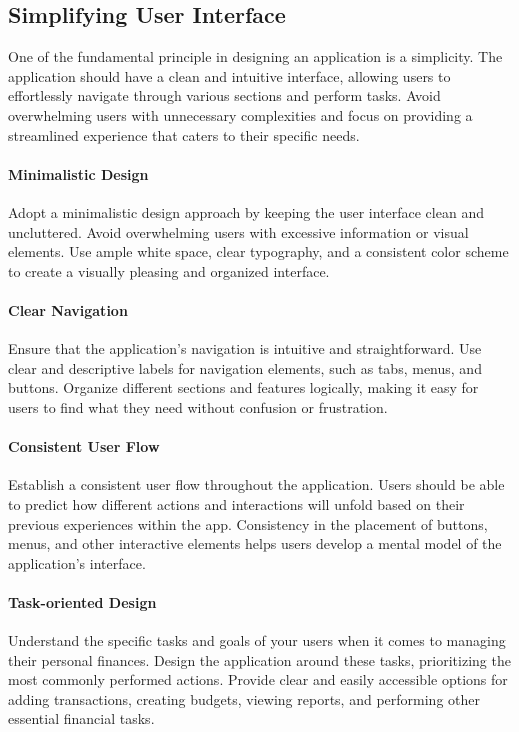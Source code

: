 \subsection{Simplifying User Interface}

One of the fundamental principle in designing an application is a simplicity. The application should have a clean and 
intuitive interface, allowing users to effortlessly navigate through various sections and perform tasks. Avoid 
overwhelming users with unnecessary complexities and focus on providing a streamlined experience that caters to 
their specific needs.

\paragraph{Minimalistic Design}
Adopt a minimalistic design approach by keeping the user interface clean and uncluttered. 
Avoid overwhelming users with excessive information or visual elements. Use ample white space, clear typography, 
and a consistent color scheme to create a visually pleasing and organized interface.

\paragraph{Clear Navigation}
Ensure that the application's navigation is intuitive and straightforward. Use clear and 
descriptive labels for navigation elements, such as tabs, menus, and buttons. Organize different sections and 
features logically, making it easy for users to find what they need without confusion or frustration.

\paragraph{Consistent User Flow}
Establish a consistent user flow throughout the application. Users should be able to 
predict how different actions and interactions will unfold based on their previous experiences within the app. 
Consistency in the placement of buttons, menus, and other interactive elements helps users develop a mental model 
of the application's interface.

\paragraph{Task-oriented Design}
Understand the specific tasks and goals of your users when it comes to managing their 
personal finances. Design the application around these tasks, prioritizing the most commonly performed actions. 
Provide clear and easily accessible options for adding transactions, creating budgets, viewing reports, and 
performing other essential financial tasks.

